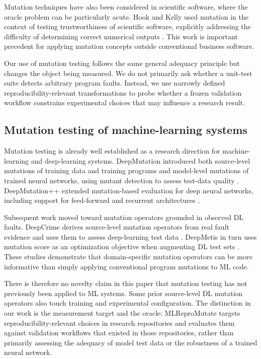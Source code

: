 Mutation techniques have also been considered in scientific software, where
the oracle problem can be particularly acute. Hook and Kelly used mutation in
the context of testing trustworthiness of scientific software, explicitly
addressing the difficulty of determining correct numerical outputs
\cite{hook2009trustworthiness}. This work is important precedent for applying
mutation concepts outside conventional business software.

Our use of mutation testing follows the same general adequacy principle but
changes the object being measured. We do not primarily ask whether a unit-test
suite detects arbitrary program faults. Instead, we use narrowly defined
reproducibility-relevant transformations to probe whether a frozen validation
workflow constrains experimental choices that may influence a research result.


\subsection{Mutation testing of machine-learning systems}
\label{sec:related-ml-mutation}

Mutation testing is already well established as a research direction for
machine-learning and deep-learning systems. DeepMutation introduced both
source-level mutations of training data and training programs and model-level
mutations of trained neural networks, using mutant detection to assess test-data
quality \cite{ma2018deepmutation}. DeepMutation++ extended mutation-based
evaluation for deep neural networks, including support for feed-forward and
recurrent architectures \cite{hu2019deepmutationpp}.

Subsequent work moved toward mutation operators grounded in observed DL faults.
DeepCrime derives source-level mutation operators from real fault evidence and
uses them to assess deep-learning test data
\cite{humbatova2021deepcrime}. DeepMetis in turn uses mutation score as an
optimization objective when augmenting DL test sets
\cite{riccio2021deepmetis}. These studies demonstrate that domain-specific
mutation operators can be more informative than simply applying conventional
program mutations to ML code.

There is therefore no novelty claim in this paper that mutation testing has not
previously been applied to ML systems. Some prior source-level DL mutation
operators also touch training and experimental configuration. The distinction
in our work is the measurement target and the oracle: MLReproMutate targets
reproducibility-relevant choices in research repositories and evaluates them
against validation workflows that existed in those repositories, rather than
primarily assessing the adequacy of model test data or the robustness of a
trained neural network.


